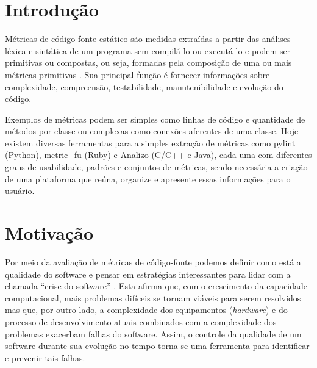 \documentclass[12pt]{article}
\begin{document}
\newpage

\section{Introdução} \label{sec:intro}
Métricas de código-fonte estático são medidas extraídas a partir das análises léxica e sintática de um programa sem compilá-lo ou executá-lo e podem ser primitivas ou compostas, ou seja, formadas pela composição de uma ou mais métricas primitivas \cite{m13}. Sua principal função é fornecer informações sobre complexidade, compreensão, testabilidade, manutenibilidade e evolução do código\cite{m13}.

Exemplos de métricas podem ser simples como linhas de código e quantidade de métodos por classe ou complexas como conexões aferentes de uma classe.
Hoje existem diversas ferramentas para a simples extração de métricas como  pylint (Python), metric\_fu (Ruby) e Analizo (C/C++ e Java), cada uma com diferentes graus de usabilidade, padrões e conjuntos de métricas, sendo necessária a criação de uma plataforma que reúna, organize e apresente essas informações para o usuário.

\section{Motivação}
Por meio da avaliação de métricas de código-fonte podemos definir como está a qualidade do software e pensar em estratégias interessantes para lidar com a chamada ``crise do software'' \cite{nr68}. Esta afirma que, com o crescimento da capacidade computacional, mais problemas difíceis se tornam viáveis para serem resolvidos mas que, por outro lado, a complexidade dos equipamentos (\textit{hardware}) e do processo de desenvolvimento atuais combinados com a complexidade dos problemas exacerbam falhas do software. Assim, o controle da qualidade de um software durante sua evolução no tempo torna-se uma ferramenta para identificar e prevenir tais falhas.
\end{document}
